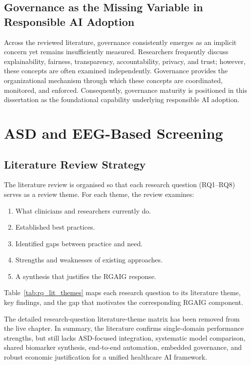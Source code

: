 \subsection{Governance as the Missing Variable in Responsible AI Adoption}
\label{sec:governance_missing_variable}

\noindent Across the reviewed literature, governance consistently emerges as an implicit concern yet remains insufficiently measured. Researchers frequently discuss explainability, fairness, transparency, accountability, privacy, and trust; however, these concepts are often examined independently. Governance provides the organizational mechanism through which these concepts are coordinated, monitored, and enforced. Consequently, governance maturity is positioned in this dissertation as the foundational capability underlying responsible AI adoption.

\section{ASD and EEG-Based Screening}

\subsection{Literature Review Strategy}

The literature review is organised so that each research question (RQ1--RQ8) serves as a review theme. For each theme, the review examines:
\begin{enumerate}[leftmargin=*, itemsep=1pt, label=(\arabic*)]
    \item What clinicians and researchers currently do.
    \item Established best practices.
    \item Identified gaps between practice and need.
    \item Strengths and weaknesses of existing approaches.
    \item A synthesis that justifies the RGAIG response.
\end{enumerate}
\noindent Table~\ref{tab:rq_lit_themes} maps each research question to its literature theme, key findings, and the gap that motivates the corresponding RGAIG component.

The detailed research-question literature-theme matrix has been removed from the live chapter. In summary, the literature confirms single-domain performance strengths, but still lacks ASD-focused integration, systematic model comparison, shared biomarker synthesis, end-to-end automation, embedded governance, and robust economic justification for a unified healthcare AI framework.


